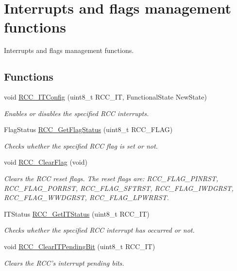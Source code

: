 \hypertarget{group___r_c_c___group4}{\section{Interrupts and flags management functions}
\label{group___r_c_c___group4}
}


Interrupts and flags management functions.  


\subsection*{Functions}
\begin{DoxyCompactItemize}
\item 
void \hyperlink{group___r_c_c___group4_gaa953aa226e9ce45300d535941e4dfe2f}{R\-C\-C\-\_\-\-I\-T\-Config} (uint8\-\_\-t R\-C\-C\-\_\-\-I\-T, Functional\-State New\-State)
\begin{DoxyCompactList}\small\item\em Enables or disables the specified R\-C\-C interrupts. \end{DoxyCompactList}\item 
Flag\-Status \hyperlink{group___r_c_c___group4_ga2897bdc52f272031c44fb1f72205d295}{R\-C\-C\-\_\-\-Get\-Flag\-Status} (uint8\-\_\-t R\-C\-C\-\_\-\-F\-L\-A\-G)
\begin{DoxyCompactList}\small\item\em Checks whether the specified R\-C\-C flag is set or not. \end{DoxyCompactList}\item 
void \hyperlink{group___r_c_c___group4_ga53f909dbb15a54124419084ebda97d72}{R\-C\-C\-\_\-\-Clear\-Flag} (void)
\begin{DoxyCompactList}\small\item\em Clears the R\-C\-C reset flags. The reset flags are\-: R\-C\-C\-\_\-\-F\-L\-A\-G\-\_\-\-P\-I\-N\-R\-S\-T, R\-C\-C\-\_\-\-F\-L\-A\-G\-\_\-\-P\-O\-R\-R\-S\-T, R\-C\-C\-\_\-\-F\-L\-A\-G\-\_\-\-S\-F\-T\-R\-S\-T, R\-C\-C\-\_\-\-F\-L\-A\-G\-\_\-\-I\-W\-D\-G\-R\-S\-T, R\-C\-C\-\_\-\-F\-L\-A\-G\-\_\-\-W\-W\-D\-G\-R\-S\-T, R\-C\-C\-\_\-\-F\-L\-A\-G\-\_\-\-L\-P\-W\-R\-R\-S\-T. \end{DoxyCompactList}\item 
I\-T\-Status \hyperlink{group___r_c_c___group4_ga6126c99f398ee4be410ad76ae3aee18f}{R\-C\-C\-\_\-\-Get\-I\-T\-Status} (uint8\-\_\-t R\-C\-C\-\_\-\-I\-T)
\begin{DoxyCompactList}\small\item\em Checks whether the specified R\-C\-C interrupt has occurred or not. \end{DoxyCompactList}\item 
void \hyperlink{group___r_c_c___group4_ga529842d165910f8f87e26115da36089b}{R\-C\-C\-\_\-\-Clear\-I\-T\-Pending\-Bit} (uint8\-\_\-t R\-C\-C\-\_\-\-I\-T)
\begin{DoxyCompactList}\small\item\em Clears the R\-C\-C's interrupt pending bits. \end{DoxyCompactList}\end{DoxyCompactItemize}


